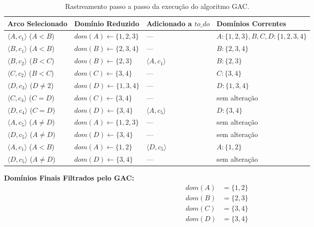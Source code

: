 \begin{enumerate}[label=(\alph*), resume]
    \begin{table}[H]
    \centering
    \caption{Rastreamento passo a passo da execução do algoritmo GAC.}
    \label{tab:gac_trace}
    \begin{tabular}{@{}llll@{}}
    \toprule
    \textbf{Arco Selecionado} & \textbf{Domínio Reduzido} & \textbf{Adicionado a $to\_do$} & \textbf{Domínios Correntes} \\ \midrule
    $\langle A, c_1 \rangle$ ($A < B$) & $dom(A) \leftarrow \{1, 2, 3\}$ & --- & $A:\{1,2,3\}, B,C,D:\{1,2,3,4\}$ \\
    $\langle B, c_1 \rangle$ ($A < B$) & $dom(B) \leftarrow \{2, 3, 4\}$ & --- & $B:\{2,3,4\}$ \\
    $\langle B, c_2 \rangle$ ($B < C$) & $dom(B) \leftarrow \{2, 3\}$ & $\langle A, c_1 \rangle$ & $B:\{2,3\}$ \\
    $\langle C, c_2 \rangle$ ($B < C$) & $dom(C) \leftarrow \{3, 4\}$ & --- & $C:\{3,4\}$ \\
    $\langle D, c_3 \rangle$ ($D \neq 2$) & $dom(D) \leftarrow \{1, 3, 4\}$ & --- & $D:\{1,3,4\}$ \\
    $\langle C, c_4 \rangle$ ($C = D$) & $dom(C) \leftarrow \{3, 4\}$ & --- & sem alteração \\
    $\langle D, c_4 \rangle$ ($C = D$) & $dom(D) \leftarrow \{3, 4\}$ & $\langle A, c_5 \rangle$ & $D:\{3,4\}$ \\
    $\langle A, c_5 \rangle$ ($A \neq D$) & $dom(A) \leftarrow \{1, 2, 3\}$ & --- & sem alteração \\
    $\langle D, c_5 \rangle$ ($A \neq D$) & $dom(D) \leftarrow \{3, 4\}$ & --- & sem alteração \\
    $\langle A, c_1 \rangle$ ($A < B$) & $dom(A) \leftarrow \{1, 2\}$ & $\langle D, c_5 \rangle$ & $A:\{1,2\}$ \\
    $\langle D, c_5 \rangle$ ($A \neq D$) & $dom(D) \leftarrow \{3, 4\}$ & --- & sem alteração \\ \bottomrule
    \end{tabular}
    \end{table}

    \noindent\textbf{Domínios Finais Filtrados pelo GAC:}
    \begin{align*}
        dom(A) &= \{1, 2\} \\
        dom(B) &= \{2, 3\} \\
        dom(C) &= \{3, 4\} \\
        dom(D) &= \{3, 4\}
    \end{align*}


\end{enumerate}
